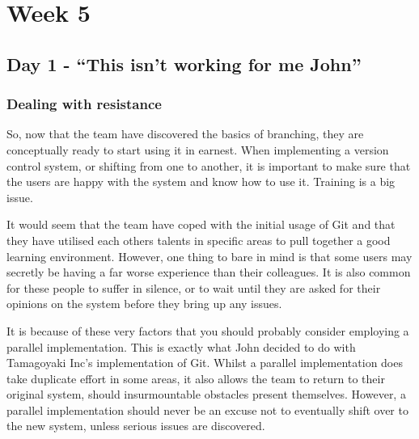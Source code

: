 \cleardoublepage
\chapter{Week 5}

\section{Day 1 - ``This isn't working for me John''}
\subsection{Dealing with resistance}

So, now that the team have discovered the basics of branching, they are conceptually ready to start using it in earnest.
When implementing a version control system, or shifting from one to another, it is important to make sure that the users are happy with the system and know how to use it.
Training is a big issue.

It would seem that the team have coped with the initial usage of Git and that they have utilised each others talents in specific areas to pull together a good learning environment.
However, one thing to bare in mind is that some users may secretly be having a far worse experience than their colleagues.
It is also common for these people to suffer in silence, or to wait until they are asked for their opinions on the system before they bring up any issues.

It is because of these very factors that you should probably consider employing a parallel implementation.
This is exactly what John decided to do with Tamagoyaki Inc's implementation of Git.
Whilst a parallel implementation does take duplicate effort in some areas, it also allows the team to return to their original system, should insurmountable obstacles present themselves.
However, a parallel implementation should never be an excuse not to eventually shift over to the new system, unless serious issues are discovered.

